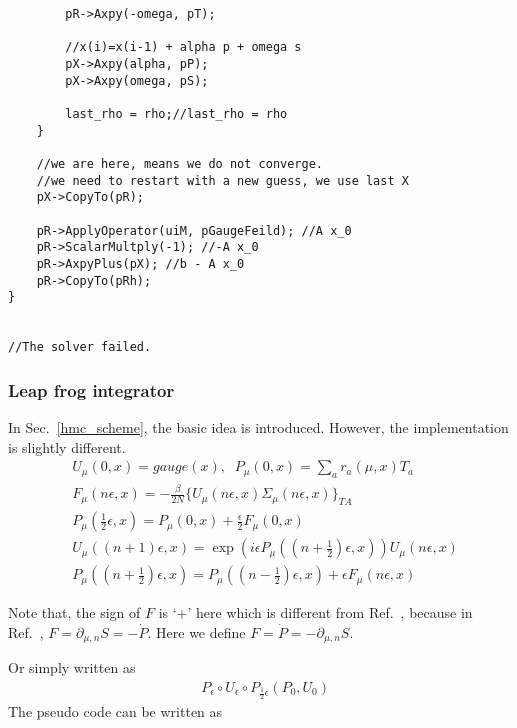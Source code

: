 \begin{lstlisting}
        pR->Axpy(-omega, pT);

        //x(i)=x(i-1) + alpha p + omega s
        pX->Axpy(alpha, pP);
        pX->Axpy(omega, pS);

        last_rho = rho;//last_rho = rho
    }

    //we are here, means we do not converge.
    //we need to restart with a new guess, we use last X
    pX->CopyTo(pR);

    pR->ApplyOperator(uiM, pGaugeFeild); //A x_0
    pR->ScalarMultply(-1); //-A x_0
    pR->AxpyPlus(pX); //b - A x_0
    pR->CopyTo(pRh);
}


//The solver failed.

\end{lstlisting}


\subsubsection{\label{Leap frog}Leap frog integrator}

In Sec.~\ref{hmc_scheme}, the basic idea is introduced. However, the implementation is slightly different.
\begin{subequations}
\begin{eqnarray}
&U_{\mu}(0,x)=gauge(x),\;\;P_{\mu}(0,x)=\sum _{a}r_a(\mu,x)T_a\\
&F_{\mu}(n\epsilon,x)=-\frac{\beta}{2N}\{U_{\mu}(n\epsilon,x)\Sigma _{\mu}(n\epsilon,x)\}_{TA}\\
&P_{\mu}(\frac{1}{2}\epsilon,x)=P_{\mu}(0,x)+\frac{\epsilon}{2}F_{\mu}(0,x)\\
&U_{\mu}((n+1)\epsilon,x)=\exp \left(i\epsilon P_{\mu}((n+\frac{1}{2})\epsilon,x)\right)U_{\mu}(n\epsilon,x)\\
&P_{\mu}((n+\frac{1}{2})\epsilon,x)=P_{\mu}((n-\frac{1}{2})\epsilon,x)+\epsilon F_{\mu}(n\epsilon,x)
\end{eqnarray}
\label{eq.hmc.update_leapfrog}
\end{subequations}

Note that, the sign of $F$ is `+' here which is different from Ref.~\cite{latticeqcdbook2010}, because in Ref.~\cite{latticeqcdbook2010}, $F=\partial _{\mu,n}S = -\dot{P}$. Here we define $F=\dot{P}=-\partial _{\mu,n}S$.

Or simply written as
\begin{equation}
\begin{split}
&P_{\epsilon}\circ U_{\epsilon}\circ P_{\frac{1}{2}\epsilon}\left(P_0,U_0\right)
\end{split}
\label{eq.hmc.update_leapfrog2}
\end{equation}
The pseudo code can be written as

